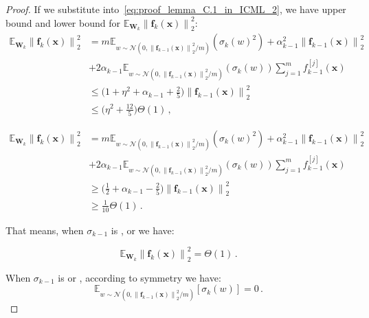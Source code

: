 \documentclass[nohyperref]{article}
\theoremstyle{plain}
\theoremstyle{definition}
\theoremstyle{remark}
\begin{document}
\begin{proof}
If we substitute into~\cref{eq:proof_lemma_C.1_in_ICML_2}, we have upper bound and lower bound for $\mathbb{E}_{\bm{W}_k} \left \| \bm{f}_k(\bm{x}) \right \|_2^2$:
\begin{equation*}
\begin{split}
    \mathbb{E}_{\bm{W}_k} \left \| \bm{f}_k(\bm{x}) \right \|_2^2 & =m\mathbb{E}_{w\sim \mathcal N(0,\left \| \bm{f}_{k-1}(\bm{x}) \right \|_2^2/m )}(\sigma_k(w)^2)+\alpha_{k-1}^2\left \| \bm{f}_{k-1}(\bm{x}) \right \|_2^2\\
    & +2\alpha_{k-1}\mathbb{E}_{w\sim \mathcal N(0,\left \| \bm{f}_{k-1}(\bm{x}) \right \|_2^2/m )}(\sigma_k(w))\sum_{j = 1}^{m}f_{k-1}^{[j]}(\bm{x})\\
    & \leq \bigg(1+\eta^2+\alpha_{k-1}+\frac{2}{5}\bigg)\left \| \bm{f}_{k-1}(\bm{x}) \right \|_2^2\\
    & \leq \bigg(\eta^2+\frac{12}{5}\bigg)\Theta(1)\,,
\end{split}
\end{equation*}

\begin{equation*}
\begin{split}
    \mathbb{E}_{\bm{W}_k} \left \| \bm{f}_k(\bm{x}) \right \|_2^2 & =m\mathbb{E}_{w\sim \mathcal N(0,\left \| \bm{f}_{k-1}(\bm{x}) \right \|_2^2/m )}(\sigma_k(w)^2)+\alpha_{k-1}^2\left \| \bm{f}_{k-1}(\bm{x}) \right \|_2^2\\
    & +2\alpha_{k-1}\mathbb{E}_{w\sim \mathcal N(0,\left \| \bm{f}_{k-1}(\bm{x}) \right \|_2^2/m)}(\sigma_k(w))\sum_{j = 1}^{m}f_{k-1}^{[j]}(\bm{x})\\
    & \geq \bigg(\frac{1}{2}+\alpha_{k-1}-\frac{2}{5}\bigg)\left \| \bm{f}_{k-1}(\bm{x}) \right \|_2^2\\
    & \geq \frac{1}{10}\Theta(1)\,.
\end{split}
\end{equation*}

That means, when $\sigma_{k-1}$ is ,  or  we have:

\begin{equation}
    \mathbb{E}_{\bm{W}_k} \left \| \bm{f}_k(\bm{x}) \right \|_2^2 =\Theta(1)\,.
\label{eq:proof_lemma_C.1_in_ICML_10}
\end{equation}

When $\sigma_{k-1}$ is  or , according to symmetry we have:
\begin{equation*}
\mathbb{E}_{w\sim \mathcal N(0,\left \| \bm{f}_{k-1}(\bm{x}) \right \|_2^2/m )}[\sigma_k(w)] = 0\,.
\end{equation*}


\end{proof}
\end{document}
